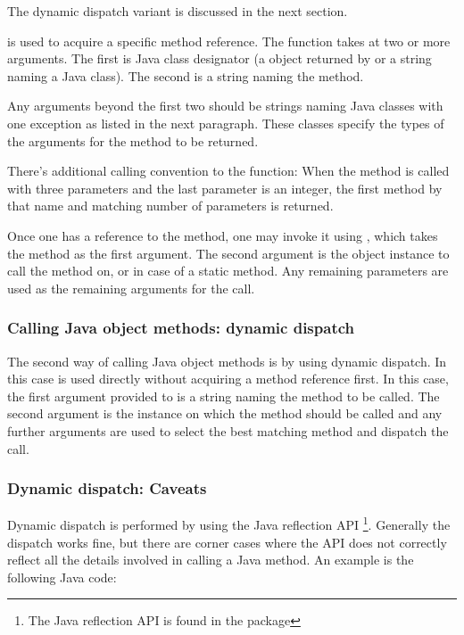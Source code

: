\documentclass[10pt]{book}
\begin{document}
The dynamic dispatch variant is discussed in the next section.

 is used to acquire a specific method reference.
The function takes at two or more arguments. The first is Java class designator
(a  object returned by  or a string naming
a Java class). The second is a string naming the method.

Any arguments beyond the first two should be strings naming Java classes with
one exception as listed in the next paragraph. These
classes specify the types of the arguments for the method to be returned.

There's additional calling convention to the  function:
When the method is called with three parameters and the last parameter is an
integer, the first method by that name and matching number of parameters is
returned.

Once one has a reference to the method, one may invoke it using
, which takes the method as the first argument. The
second argument is the object instance to call the method on, or
 in case of a static method.  Any remaining parameters are
used as the remaining arguments for the call.

\subsubsection{Calling Java object methods: dynamic dispatch}

The second way of calling Java object methods is by using dynamic dispatch.
In this case  is used directly without acquiring a method
reference first. In this case, the first argument provided to 
is a string naming the method to be called. The second argument is the instance
on which the method should be called and any further arguments are used to
select the best matching method and dispatch the call.

\subsubsection{Dynamic dispatch: Caveats}

Dynamic dispatch is performed by using the Java reflection
API \footnote{The Java reflection API is found in the
   package}. Generally the dispatch works
fine, but there are corner cases where the API does not correctly
reflect all the details involved in calling a Java method. An example
is the following Java code:
\end{document}
